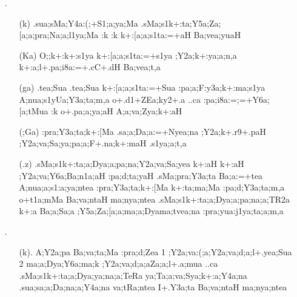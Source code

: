 \begin{spacing}{1.15}
\begin{itemize}
\item[{\sktf 11}.] \begin{itemize}
        \item[({\sktf k})] {\sktf .sua;sMa;Y4a:(;+S1;a;ya;Ma
.sMa;s1k+:ta;Y5a;Za;[a;a;pra;Na;a;l1ya;Ma :k
:k k+:[a;a;s1ta:=+aH Ba;vea;yuaH}
           
           \item[({\sktf Ka})] {\sktf O;;k+:k+:s1ya
k+:[a;a;s1ta:=+s1ya ;Y2a;k+:ya;a;n,a k+:a;l+.pa;i8a:=+.cC+.dH
Ba;vea;t,a}
            
           \item[({\sktf ga})] {\sktf .tea;Sua .tea;Sua
k+:[a;a;s1ta:=+Sua :pa;a;F:y3a;k+:ma;s1ya
A;nua;s1yUa;Y3a;ta;m,a o+.d1+ZEa;ky2+.a ..ca
:pa;i8a:=;=+Y6a;[a;tMua :k o+.pa;a;ya;aH
A;a;va;Zya;k+:aH}
           
           \item[({\sktf ;Ga})] {\sktf :pra;Y3a;ta;k+:[Ma .sa;a;Da;a:=+Nyea;na
;Y2a;k+.r9+.paH ;Y2a;va;Sa;ya;pa;a;F+.na;k+:maH
.s1ya;a;t,a} 
           
           \item[({\sktf .z})] {\sktf .sMa;s1k+:ta;a;Dya;a;pa;na;Y2a;va;Sa;yea k+:aH k+:aH
;Y2a;va;Y6a;Ba;n1a;aH :pa;d;ta;yaH .sMa;pra;Y3a;ta
Ba;a:=+tea A;nua;a;s1:a;ya;ntea 
:pra;Y3a;ta;k+:[Ma k+:ta;ma;Ma :pa;d;Y3a;ta;m,a o+t1a;mMa
Ba;va;ntaH ma;nya;ntea  .sMa;s1k+:ta;a;Dya;a;pa;na;a;TR2a k+:a Ba;a;Sa;a {;Y5a;Za;[a;a;ma;a}{;Dya}{ma;tvea;na} :pra;yua:j1ya;ta;a;m,a }
           \end{itemize}

\item[{\sktf 12}.]\begin{itemize}
        \item[({\sktf k}).] {\sktf A;Y2a;pa Ba;va;ta;Ma :pra;d;Zea
\ZF{(}1\ZF{)} ;Y2a;va:(;a;Y2a;va;d;a;l+.yea;Sua
\ZF{(}2\ZF{)} ma;a;Dya;Y6a;ma;k ;Y2a;va;d;a;a\ZF{-}Za;a;l+.a;mua
..ca .sMa;s1k+:ta;a;Dya;ya;na;a;TeRa
ya;Ta;a;va;Sya;k+:a;Y4a;na .sua;sa;a;Da;na;a;Y4a;na va;tRa;ntea I+.Y3a;ta
Ba;va;ntaH ma;nya;ntea}
                

\end{itemize}
\end{itemize}
\end{spacing}
